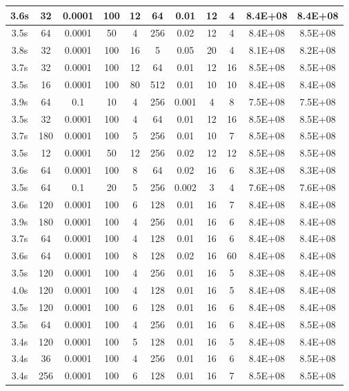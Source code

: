 \begin{longtable}{|c|c|c|c|c|c|c|c|c|c|c|}
3.6s & 32 & 0.0001 & 100 & 12 & 64 & 0.01 & 12 & 4 & 8.4E+08 & 8.4E+08 \\ \hline
3.5s & 64 & 0.0001 & 50 & 4 & 256 & 0.02 & 12 & 4 & 8.4E+08 & 8.5E+08 \\ \hline
3.8s & 32 & 0.0001 & 100 & 16 & 5 & 0.05 & 20 & 4 & 8.1E+08 & 8.2E+08 \\ \hline
3.7s & 32 & 0.0001 & 100 & 12 & 64 & 0.01 & 12 & 16 & 8.5E+08 & 8.5E+08 \\ \hline
3.5s & 16 & 0.0001 & 100 & 80 & 512 & 0.01 & 10 & 10 & 8.4E+08 & 8.4E+08 \\ \hline
3.9s & 64 & 0.1 & 10 & 4 & 256 & 0.001 & 4 & 8 & 7.5E+08 & 7.5E+08 \\ \hline
3.5s & 32 & 0.0001 & 100 & 4 & 64 & 0.01 & 12 & 16 & 8.5E+08 & 8.5E+08 \\ \hline
3.7s & 180 & 0.0001 & 100 & 5 & 256 & 0.01 & 10 & 7 & 8.5E+08 & 8.5E+08 \\ \hline
3.5s & 12 & 0.0001 & 50 & 12 & 256 & 0.02 & 12 & 12 & 8.5E+08 & 8.5E+08 \\ \hline
3.6s & 64 & 0.0001 & 100 & 8 & 64 & 0.02 & 16 & 6 & 8.3E+08 & 8.3E+08 \\ \hline
3.5s & 64 & 0.1 & 20 & 5 & 256 & 0.002 & 3 & 4 & 7.6E+08 & 7.6E+08 \\ \hline
3.6s & 120 & 0.0001 & 100 & 6 & 128 & 0.01 & 16 & 7 & 8.4E+08 & 8.4E+08 \\ \hline
3.9s & 180 & 0.0001 & 100 & 4 & 256 & 0.01 & 16 & 6 & 8.4E+08 & 8.4E+08 \\ \hline
3.7s & 64 & 0.0001 & 100 & 4 & 128 & 0.01 & 16 & 6 & 8.4E+08 & 8.4E+08 \\ \hline
3.6s & 64 & 0.0001 & 100 & 8 & 128 & 0.02 & 16 & 60 & 8.4E+08 & 8.4E+08 \\ \hline
3.5s & 120 & 0.0001 & 100 & 4 & 256 & 0.01 & 16 & 5 & 8.3E+08 & 8.4E+08 \\ \hline
4.0s & 120 & 0.0001 & 100 & 4 & 128 & 0.01 & 16 & 5 & 8.4E+08 & 8.4E+08 \\ \hline
3.5s & 120 & 0.0001 & 100 & 6 & 128 & 0.01 & 16 & 6 & 8.4E+08 & 8.4E+08 \\ \hline
3.5s & 64 & 0.0001 & 100 & 4 & 256 & 0.01 & 16 & 6 & 8.4E+08 & 8.5E+08 \\ \hline
3.4s & 120 & 0.0001 & 100 & 5 & 128 & 0.01 & 16 & 5 & 8.4E+08 & 8.4E+08 \\ \hline
3.4s & 36 & 0.0001 & 100 & 4 & 256 & 0.01 & 16 & 6 & 8.4E+08 & 8.5E+08 \\ \hline
3.4s & 256 & 0.0001 & 100 & 6 & 128 & 0.01 & 16 & 7 & 8.5E+08 & 8.5E+08 \\ \hline

\end{longtable}
